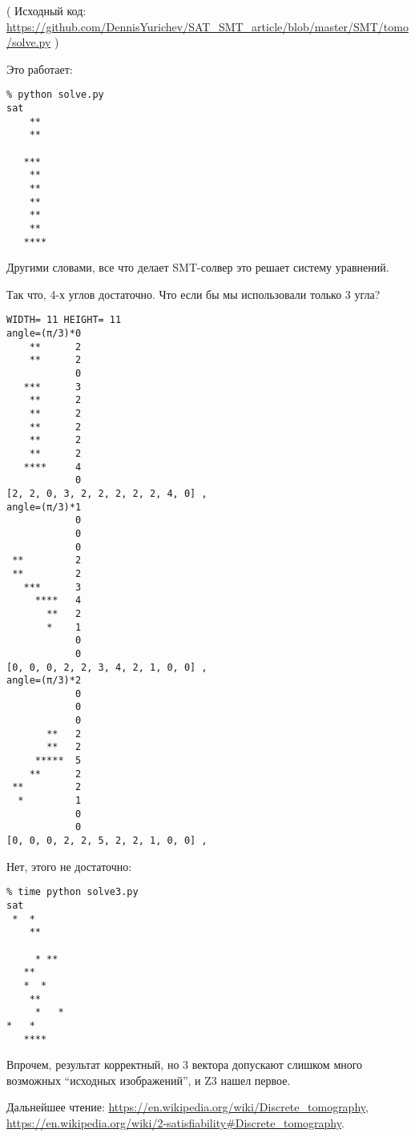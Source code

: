 ( Исходный код: \url{https://github.com/DennisYurichev/SAT_SMT_article/blob/master/SMT/tomo/solve.py} )

Это работает:

\begin{lstlisting}
% python solve.py
sat
    **
    **

   ***
    **
    **
    **
    **
    **
   ****
\end{lstlisting}

Другими словами, все что делает SMT-солвер это решает систему уравнений.

Так что, 4-х углов достаточно.
Что если бы мы использовали только 3 угла?

\begin{lstlisting}
WIDTH= 11 HEIGHT= 11
angle=(π/3)*0
    **      2
    **      2
            0
   ***      3
    **      2
    **      2
    **      2
    **      2
    **      2
   ****     4
            0
[2, 2, 0, 3, 2, 2, 2, 2, 2, 4, 0] ,
angle=(π/3)*1
            0
            0
            0
 **         2
 **         2
   ***      3
     ****   4
       **   2
       *    1
            0
            0
[0, 0, 0, 2, 2, 3, 4, 2, 1, 0, 0] ,
angle=(π/3)*2
            0
            0
            0
       **   2
       **   2
     *****  5
    **      2
 **         2
  *         1
            0
            0
[0, 0, 0, 2, 2, 5, 2, 2, 1, 0, 0] ,
\end{lstlisting}

Нет, этого не достаточно:

\begin{lstlisting}
% time python solve3.py
sat
 *  *
    **

     * **
   **
   *  *
    **
     *   *
*   *
   ****
\end{lstlisting}

Впрочем, результат корректный, но 3 вектора допускают слишком много возможных ``исходных изображений'', и Z3 нашел
первое.

Дальнейшее чтение:
\url{https://en.wikipedia.org/wiki/Discrete_tomography},
\url{https://en.wikipedia.org/wiki/2-satisfiability#Discrete_tomography}.

